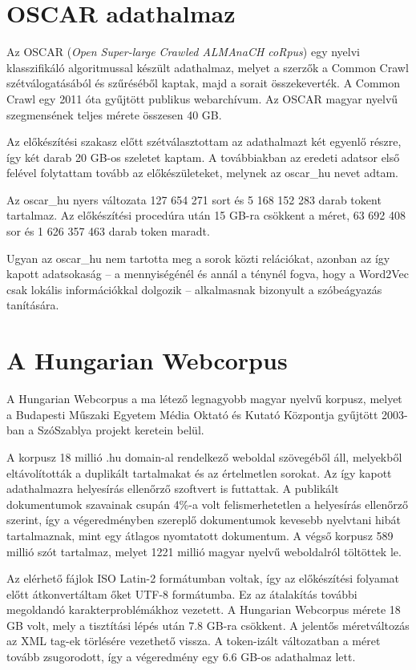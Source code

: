 \section{OSCAR adathalmaz}

Az OSCAR (\textit{Open Super-large Crawled ALMAnaCH coRpus}) \cite{oscar} egy nyelvi klasszifikáló algoritmussal készült adathalmaz, melyet a szerzők a Common Crawl \cite{common} szétválogatásából és szűréséből kaptak, majd a sorait összekeverték. A Common Crawl egy 2011 óta gyűjtött publikus webarchívum. Az OSCAR magyar nyelvű szegmensének teljes mérete összesen 40 GB. 

Az előkészítési szakasz előtt szétválasztottam az adathalmazt két egyenlő részre, így két darab 20 GB-os szeletet kaptam. A továbbiakban az eredeti adatsor első felével folytattam tovább az előkészületeket, melynek az oscar\_hu nevet adtam.

Az oscar\_hu nyers változata 127 654 271 sort és 5 168 152 283 darab tokent tartalmaz. Az előkészítési procedúra után 15 GB-ra csökkent a méret, 63 692 408 sor és 1 626 357 463 darab token maradt.

Ugyan az oscar\_hu nem tartotta meg a sorok közti relációkat, azonban az így kapott adatsokaság – a mennyiségénél és annál a ténynél fogva, hogy a Word2Vec csak lokális információkkal dolgozik – alkalmasnak bizonyult a szóbeágyazás tanítására.

\section{A Hungarian Webcorpus}

A Hungarian Webcorpus \cite{hungarian_webcorpus} a ma létező legnagyobb magyar nyelvű korpusz, melyet a Budapesti Műszaki Egyetem Média Oktató és Kutató Központja gyűjtött 2003-ban a SzóSzablya projekt keretein belül.

A korpusz 18 millió .hu domain-al rendelkező weboldal szövegéből áll, melyekből eltávolították a duplikált tartalmakat és az értelmetlen sorokat. Az így kapott adathalmazra helyesírás ellenőrző szoftvert is futtattak. A publikált dokumentumok szavainak csupán 4\%-a volt felismerhetetlen a helyesírás ellenőrző szerint, így a végeredményben szereplő dokumentumok kevesebb nyelvtani hibát tartalmaznak, mint egy átlagos nyomtatott dokumentum. A végső korpusz 589 millió szót tartalmaz, melyet 1221 millió magyar nyelvű weboldalról töltöttek le.

Az elérhető fájlok ISO Latin-2 formátumban voltak, így az előkészítési folyamat előtt átkonvertáltam őket UTF-8 formátumba. Ez az átalakítás további megoldandó karakterproblémákhoz vezetett. A Hungarian Webcorpus mérete 18 GB volt, mely a tisztítási lépés után 7.8 GB-ra csökkent. A jelentős méretváltozás az XML tag-ek törlésére vezethető vissza. A token-izált változatban a méret tovább zsugorodott, így a végeredmény egy 6.6 GB-os adathalmaz lett.

